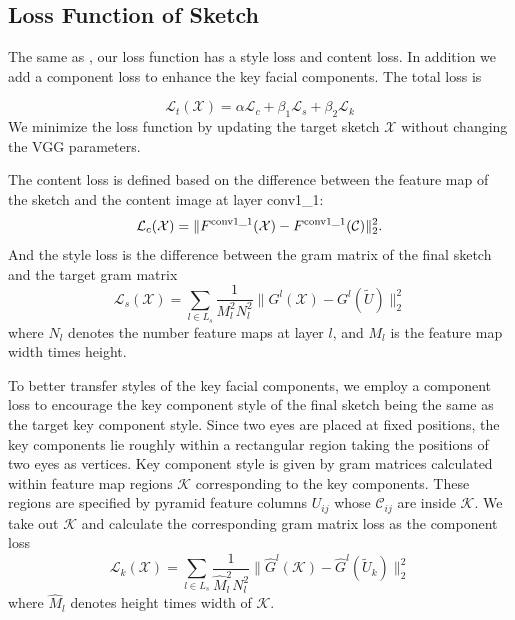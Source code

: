 \documentclass[10pt,twocolumn,letterpaper]{article}
\begin{document}
\subsection{Loss Function of Sketch}

The same as \cite{gatys2015neural}, our loss function has a style loss and content loss. In addition we add a component loss to enhance the key facial components. The total loss is

\begin{equation}
\mathcal{L}_{t}( \mathcal{X} ) = \alpha \mathcal{L}_{c} + \beta_1 \mathcal{L}_{s} + \beta_2 \mathcal{L}_{k}
\label{eq:Total_loss}
\end{equation}
We minimize the loss function by updating the target sketch $\mathcal{X}$ without changing the VGG parameters.

The content loss is defined based on the difference between the feature map of the sketch and the content image at layer conv1\_1:
\begin{equation}
\mathcal{L}_{c}( \mathcal{X} ) = \| {{F^{\rm{conv1\_1}}}( \mathcal{X} ) - {F^{\rm{conv1\_1}}}( \mathcal{C} )} \|_2^2.
\label{eq:content_loss}
\end{equation}
And the style loss is the difference between the gram matrix of the final sketch and the target gram matrix 
\begin{equation}
\mathcal{L}_{s} ( \mathcal{X} ) = \sum\limits_{l \in {L_s}} {\frac{1}{{M_l^2N_l^2}}\| {{G^l}( \mathcal{X} ) - G^l(\tilde{U})} \|_2^2} 
\label{eq:Gram_loss}
\end{equation}
where $N_l$ denotes the number feature maps at layer $l$, and $M_l$ is the feature map width times height.  

To better transfer styles of the key facial components, we employ a component loss to encourage the key component style of the final sketch being the same as the target key component style. Since two eyes are placed at fixed positions, the key components lie roughly within a rectangular region taking the positions of two eyes as vertices. Key component style is given by gram matrices calculated within feature map regions $\mathcal K$ corresponding to the key components. These regions are specified by pyramid feature columns $U_{ij}$ whose $\mathcal{C}_{ij}$ are inside $\mathcal K$. We take out $\mathcal K$ and calculate the corresponding gram matrix loss as the component loss
\begin{equation}
\mathcal{L}_{k} ( \mathcal{X} ) = \sum\limits_{l \in {L_s}} {\frac{1}{{\hat{M}_l^2{N}_l^2}}\| {{{\hat G}^l}( \mathcal{K} ) - {\hat G}^l(\tilde{U}_k)} \|_2^2} 
\label{eq:component_loss}
\end{equation}
where $\hat{M}_l$ denotes height times width of $\mathcal K$. 
\end{document}
